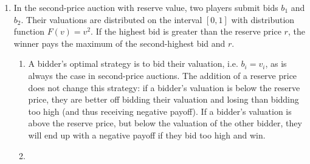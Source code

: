 \documentclass[11pt]{article}
\begin{document}
\begin{enumerate}
	\item In the second-price auction with reserve value, two players submit bids \( b_1 \) and \( b_2 \). Their valuations are distributed on the interval \( [0,1] \) with distribution function \( F(v) = v^2 \). If the highest bid is greater than the reserve price \( r \), the winner pays the maximum of the second-highest bid and \( r \). 
	\begin{enumerate}
		\item A bidder's optimal strategy is to bid their valuation, i.e. \( b_i = v_i \), as is always the case in second-price auctions. The addition of a reserve price does not change this strategy: if a bidder's valuation is below the reserve price, they are better off bidding their valuation and losing than bidding too high (and thus receiving negative payoff). If a bidder's valuation is above the reserve price, but below the valuation of the other bidder, they will end up with a negative payoff if they bid too high and win. 
		\item 
	\end{enumerate}
\end{enumerate}
\end{document}
